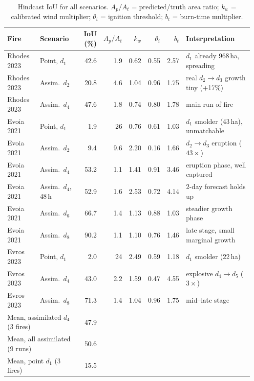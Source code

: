 \documentclass[11pt]{article}
\begin{document}
\begin{table}[htbp]
\centering
\caption{Hindcast IoU for all scenarios. $A_p/A_t$ = predicted/truth area
ratio; $k_w$ = calibrated wind multiplier; $\theta_i$ = ignition threshold;
$b_t$ = burn-time multiplier.}
\small
\begin{tabular}{llrrrrrl}
\toprule
Fire & Scenario & IoU (\%) & $A_p/A_t$ & $k_w$ & $\theta_i$ & $b_t$ &
Interpretation \\
\midrule
Rhodes 2023 & Point, $d_1$      & 42.6 & 1.9 & 0.62 & 0.55 & 2.57 & $d_1$ already 968\,ha, spreading \\
Rhodes 2023 & Assim.\ $d_2$     & 20.8 & 4.6 & 1.04 & 0.96 & 1.75 & real $d_2{\to}d_3$ growth tiny (+17\%) \\
Rhodes 2023 & Assim.\ $d_4$     & 47.6 & 1.8 & 0.74 & 0.80 & 1.78 & main run of fire \\
Evoia 2021  & Point, $d_1$      &  1.9 & 26  & 0.76 & 0.61 & 1.03 & $d_1$ smolder (43\,ha), unmatchable \\
Evoia 2021  & Assim.\ $d_2$     &  9.4 & 9.6 & 2.20 & 0.16 & 1.66 & $d_2{\to}d_3$ eruption ($43\times$) \\
Evoia 2021  & Assim.\ $d_4$     & 53.2 & 1.1 & 1.41 & 0.91 & 3.46 & eruption phase, well captured \\
Evoia 2021  & Assim.\ $d_4$, 48\,h & 52.9 & 1.6 & 2.53 & 0.72 & 4.14 & 2-day forecast holds up \\
Evoia 2021  & Assim.\ $d_6$     & 66.7 & 1.4 & 1.13 & 0.88 & 1.03 & steadier growth phase \\
Evoia 2021  & Assim.\ $d_8$     & 90.2 & 1.1 & 1.10 & 0.76 & 1.46 & late stage, small marginal growth \\
Evros 2023  & Point, $d_1$      &  2.0 & 24  & 2.49 & 0.59 & 1.18 & $d_1$ smolder (22\,ha) \\
Evros 2023  & Assim.\ $d_4$     & 43.0 & 2.2 & 1.59 & 0.47 & 4.55 & explosive $d_4{\to}d_5$ ($3\times$) \\
Evros 2023  & Assim.\ $d_8$     & 71.3 & 1.4 & 1.04 & 0.96 & 1.75 & mid--late stage \\
\midrule
\multicolumn{2}{l}{Mean, assimilated $d_4$ (3 fires)} & 47.9 & & & & & \\
\multicolumn{2}{l}{Mean, all assimilated (9 runs)}    & 50.6 & & & & & \\
\multicolumn{2}{l}{Mean, point $d_1$ (3 fires)}       & 15.5 & & & & & \\
\bottomrule
\end{tabular}
\end{table}
\end{document}
